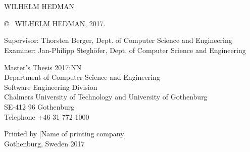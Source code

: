\newpage
\thispagestyle{plain}
\vspace*{4.5cm}
\fullt\\
\subt\\
WILHELM HEDMAN \setlength{\parskip}{1cm}

\copyright ~ WILHELM HEDMAN, 2017. \setlength{\parskip}{1cm}

Supervisor: Thorsten Berger, Dept. of Computer Science and Engineering\\
Examiner: Jan-Philipp Steghöfer, Dept. of Computer Science and Engineering \setlength{\parskip}{1cm}

Master's Thesis 2017:NN\\	%
Department of Computer Science and Engineering\\
Software Engineering Division\\
Chalmers University of Technology and University of Gothenburg\\
SE-412 96 Gothenburg\\
Telephone +46 31 772 1000 \setlength{\parskip}{0.5cm}

\vfill


Printed by [Name of printing company]\\
Gothenburg, Sweden 2017


